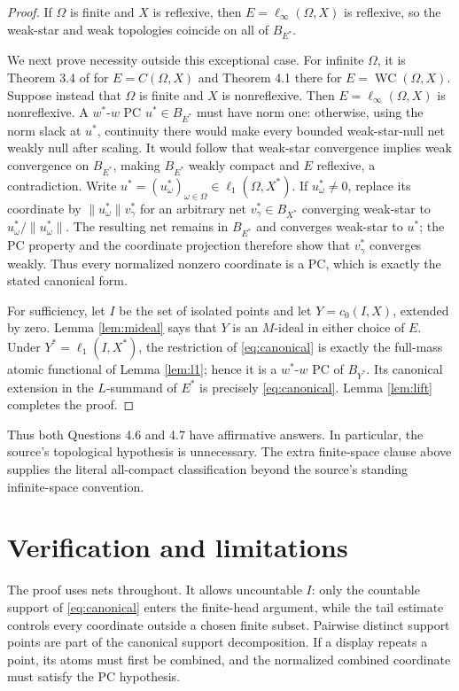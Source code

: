 \documentclass[11pt]{article}
\newcommand{\WC}{\operatorname{WC}}
\begin{document}
\begin{proof}
If $\Omega$ is finite and $X$ is reflexive, then
$E=\ell_\infty(\Omega,X)$ is reflexive, so the weak-star and weak topologies
coincide on all of $B_{E^*}$.

We next prove necessity outside this exceptional case.  For infinite
$\Omega$, it is Theorem 3.4 of \cite{source} for $E=C(\Omega,X)$ and Theorem
4.1 there for $E=\WC(\Omega,X)$.  Suppose instead that $\Omega$ is finite and
$X$ is nonreflexive.  Then $E=\ell_\infty(\Omega,X)$ is nonreflexive.  A
$w^*$-$w$ PC $u^*\in B_{E^*}$ must have norm one: otherwise, using the norm
slack at $u^*$, continuity there would make every bounded weak-star-null net
weakly null after scaling.  It would follow that weak-star convergence implies
weak convergence on $B_{E^*}$, making $B_{E^*}$ weakly compact and $E$
reflexive, a contradiction.  Write
$u^*=(u_\omega^*)_{\omega\in\Omega}\in\ell_1(\Omega,X^*)$.  If
$u_\omega^*\ne0$, replace its coordinate by
$\lVert u_\omega^*\rVert v_\gamma^*$ for an arbitrary net
$v_\gamma^*\in B_{X^*}$ converging weak-star to
$u_\omega^*/\lVert u_\omega^*\rVert$.  The resulting net remains in
$B_{E^*}$ and converges weak-star to $u^*$; the PC property and the coordinate
projection therefore show that $v_\gamma^*$ converges weakly.  Thus every
normalized nonzero coordinate is a PC, which is exactly the stated canonical
form.

For sufficiency, let $I$ be the set of isolated points and let
$Y=c_0(I,X)$, extended by zero.  Lemma \ref{lem:mideal} says that $Y$ is an
$M$-ideal in either choice of $E$.  Under
$Y^*=\ell_1(I,X^*)$, the restriction of \eqref{eq:canonical} is exactly the
full-mass atomic functional of Lemma \ref{lem:l1}; hence it is a $w^*$-$w$ PC
of $B_{Y^*}$.  Its canonical extension in the $L$-summand of $E^*$ is
precisely \eqref{eq:canonical}.  Lemma \ref{lem:lift} completes the proof.
\end{proof}

Thus both Questions 4.6 and 4.7 have affirmative answers.  In particular, the
source's topological hypothesis is unnecessary.  The extra finite-space clause
above supplies the literal all-compact classification beyond the source's
standing infinite-space convention.

\section*{Verification and limitations}

The proof uses nets throughout.  It allows uncountable $I$: only the countable
support of \eqref{eq:canonical} enters the finite-head argument, while the
tail estimate controls every coordinate outside a chosen finite subset.
Pairwise distinct support points are part of the canonical support
decomposition.  If a display repeats a point, its atoms must first be combined,
and the normalized combined coordinate must satisfy the PC hypothesis.
\end{document}
